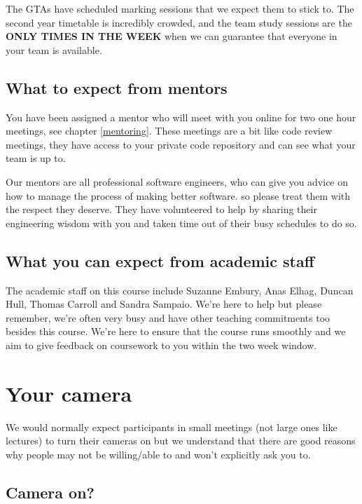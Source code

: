 \documentclass[
]{book}
\begin{document}
The GTAs have scheduled marking sessions that we expect them to stick to. The second year timetable is incredibly crowded, and the team study sessions are the \textbf{ONLY TIMES IN THE WEEK} when we can guarantee that everyone in your team is available.

\hypertarget{gomentors}{%
\subsection{What to expect from mentors}\label{gomentors}}

You have been assigned a mentor who will meet with you online for two one hour meetings, see chapter \ref{mentoring}. These meetings are a bit like code review meetings, they have access to your private code repository and can see what your team is up to.

Our mentors are all professional software engineers, who can give you advice on how to manage the process of making better software. so please treat them with the respect they deserve. They have volunteered to help by sharing their engineering wisdom with you and taken time out of their busy schedules to do so.

\hypertarget{academics}{%
\subsection{What you can expect from academic staff}\label{academics}}

The academic staff on this course include Suzanne Embury, Anas Elhag, Duncan Hull, Thomas Carroll and Sandra Sampaio. We're here to help but please remember, we're often very busy and have other teaching commitments too besides this course. We're here to ensure that the course runs smoothly and we aim to give feedback on coursework to you within the two week window.

\hypertarget{cameras}{%
\section{Your camera}\label{cameras}}

We would normally expect participants in small meetings (not large ones like lectures) to turn their cameras on but we understand that there are good reasons why people may not be willing/able to and won't explicitly ask you to.

\hypertarget{on}{%
\subsection{Camera on?}\label{on}}
\end{document}

